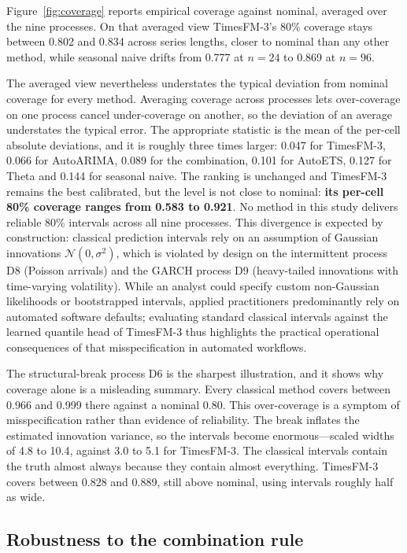\documentclass[11pt]{article}
\providecommand{\figureref}[1]{Figure~\ref{#1}}
\begin{document}
\figureref{fig:coverage} reports empirical coverage against nominal, averaged over the nine
processes. On that averaged view TimesFM-3's 80\% coverage stays between 0.802 and 0.834 across
series lengths, closer to nominal than any other method, while seasonal naive drifts from 0.777
at $n = 24$ to 0.869 at $n = 96$.

The averaged view nevertheless understates the typical deviation from nominal coverage for
every method. Averaging coverage across processes lets over-coverage on one process cancel
under-coverage on another, so the deviation of an average understates the typical error. The
appropriate statistic is the mean of the per-cell absolute deviations, and it is roughly three
times larger: 0.047 for TimesFM-3, 0.066 for AutoARIMA, 0.089 for the combination, 0.101 for
AutoETS, 0.127 for Theta and 0.144 for seasonal naive. The ranking is unchanged and TimesFM-3
remains the best calibrated, but the level is not close to nominal: \textbf{its per-cell 80\%
coverage ranges from 0.583 to 0.921}. No method in this study delivers reliable 80\% intervals
across all nine processes. This divergence is expected by construction: classical prediction intervals rely on an assumption of
Gaussian innovations $\mathcal{N}(0, \sigma^2)$, which is violated by design on the intermittent
process D8 (Poisson arrivals) and the GARCH process D9 (heavy-tailed innovations with time-varying volatility).
While an analyst could specify custom non-Gaussian likelihoods or bootstrapped intervals, applied practitioners
predominantly rely on automated software defaults; evaluating standard classical intervals against the
learned quantile head of TimesFM-3 thus highlights the practical operational consequences of that misspecification in automated workflows.

The structural-break process D6 is the sharpest illustration, and it shows why coverage alone
is a misleading summary. Every classical method covers between 0.966 and 0.999 there against a
nominal 0.80. This over-coverage is a symptom of misspecification rather than evidence of reliability. The break inflates the estimated
innovation variance, so the intervals become enormous---scaled widths of 4.8 to 10.4, against
3.0 to 5.1 for TimesFM-3. The classical intervals contain the truth almost always because they
contain almost everything. TimesFM-3 covers between 0.828 and 0.889, still above nominal, using
intervals roughly half as wide.

\subsection{Robustness to the combination rule}
\label{sec:combination}
\end{document}
